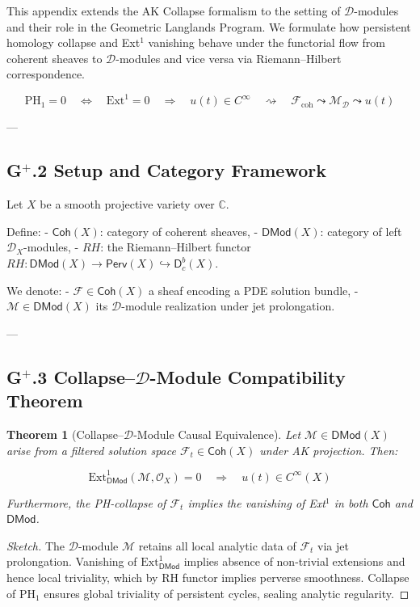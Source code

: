 \documentclass[11pt]{article}
\newtheorem{theorem}{Theorem}[section]
\begin{document}
This appendix extends the AK Collapse formalism to the setting of $\mathcal{D}$-modules and their role in the Geometric Langlands Program.  
We formulate how persistent homology collapse and Ext$^1$ vanishing behave under the functorial flow from coherent sheaves to $\mathcal{D}$-modules  
and vice versa via Riemann–Hilbert correspondence.

\[
\boxed{
\mathrm{PH}_1 = 0 \quad \Leftrightarrow \quad \mathrm{Ext}^1 = 0 \quad \Rightarrow \quad u(t) \in C^\infty
}
\quad \rightsquigarrow \quad
\boxed{
\mathcal{F}_{\mathrm{coh}} \leadsto \mathcal{M}_{\mathcal{D}} \leadsto u(t)
}
\]

---

\subsection*{G$^+$.2 Setup and Category Framework}

Let $X$ be a smooth projective variety over $\mathbb{C}$.

Define:
- $\mathsf{Coh}(X)$: category of coherent sheaves,
- $\mathsf{DMod}(X)$: category of left $\mathcal{D}_X$-modules,
- $RH$: the Riemann–Hilbert functor \( RH: \mathsf{DMod}(X) \to \mathsf{Perv}(X) \hookrightarrow \mathsf{D}^b_c(X) \).

We denote:
- $\mathcal{F} \in \mathsf{Coh}(X)$ a sheaf encoding a PDE solution bundle,
- $\mathcal{M} \in \mathsf{DMod}(X)$ its $\mathcal{D}$-module realization under jet prolongation.

---

\subsection*{G$^+$.3 Collapse–$\mathcal{D}$-Module Compatibility Theorem}

\begin{theorem}[Collapse–$\mathcal{D}$-Module Causal Equivalence]
Let $\mathcal{M} \in \mathsf{DMod}(X)$ arise from a filtered solution space $\mathcal{F}_t \in \mathsf{Coh}(X)$ under AK projection.  
Then:

\[
\mathrm{Ext}^1_{\mathsf{DMod}}(\mathcal{M}, \mathcal{O}_X) = 0
\quad \Rightarrow \quad
u(t) \in C^\infty(X)
\]

Furthermore, the PH-collapse of $\mathcal{F}_t$ implies the vanishing of Ext$^1$ in both $\mathsf{Coh}$ and $\mathsf{DMod}$.
\end{theorem}

\begin{proof}[Sketch]
The $\mathcal{D}$-module $\mathcal{M}$ retains all local analytic data of $\mathcal{F}_t$ via jet prolongation.  
Vanishing of $\mathrm{Ext}^1_{\mathsf{DMod}}$ implies absence of non-trivial extensions and hence local triviality,  
which by RH functor implies perverse smoothness.  
Collapse of $\mathrm{PH}_1$ ensures global triviality of persistent cycles, sealing analytic regularity.
\end{proof}
\end{document}
